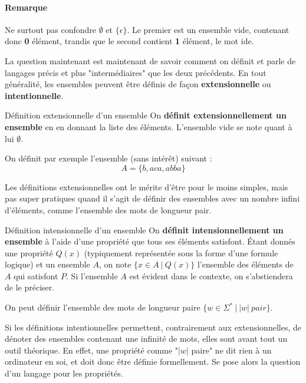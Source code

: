 \paragraph{Remarque} Ne surtout pas confondre $\emptyset$ et $\{\epsilon\}$. Le premier est un ensemble vide, contenant donc \textbf{0} élément, trandis que le second contient \textbf{1} élément, le mot ide. 

La question maintenant est maintenant de savoir comment on définit et parle de langages précis et plus "intermédiaires" que les deux précédents. En tout généralité, les ensembles peuvent être définis de façon \textbf{extensionnelle} ou \textbf{intentionnelle}. 

\begin{definition}{Définition extensionnelle d'un ensemble}{}
On \textbf{définit extensionnellement un ensemble} en en donnant la liste des éléments. L'ensemble vide se note quant à lui $\emptyset$.
\end{definition}

\begin{example} On définit par exemple l'ensemble (sans intérêt) suivant :
\[
    A = \{b, aca, abba\}
\]
\end{example}

Les définitions extensionnelles ont le mérite d'être pour le moins simples, mais pas super pratiques quand il s'agit de définir des ensembles avec un nombre infini d'éléments, comme l'ensemble des mots de longueur pair. 

\begin{definition}{Définition intensionnelle d'un ensemble}{}
On \textbf{définit intensionnellement un ensemble} à l'aide d'une propriété que tous ses éléments satisfont. Étant donnés une propriété $Q(x)$ (typiquement représentée sous la forme d'une formule logique) et un ensemble $A$, on note $\{x \in A~|~Q(x)\}$ l'ensemble des éléments de $A$ qui satisfont $P$. Si l'ensemble $A$ est évident dans le contexte, on s'abstiendera de le préciser.
\end{definition}

\begin{example}
On peut définir l'ensemble des mots de longueur paire $\{w \in \Sigma^*~|~|w|~pair\}$.
\end{example}

Si les définitions intentionnelles permettent, contrairement aux extensionnelles, de dénoter des ensembles contenant une infinité de mots, elles sont avant tout un outil théorique. En effet, une propriété comme "$|w|$ paire" ne dit rien à un ordinateur en soi, et doit donc être définie formellement. Se pose alors la question d'un langage pour les propriétés.

